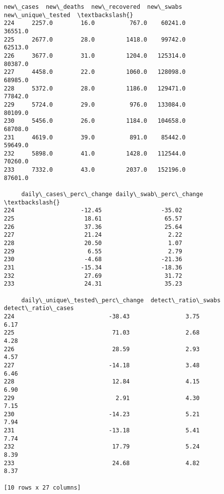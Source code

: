\documentclass[11pt]{article}
\begin{document}
\begin{tcolorbox}[breakable, size=fbox, boxrule=.5pt, pad at break*=1mm, opacityfill=0]
\begin{Verbatim}[commandchars=\\\{\}]
     new\_cases  new\_deaths  new\_recovered  new\_swabs  new\_unique\_tested  \textbackslash{}
224     2257.0        16.0          767.0    60241.0            36551.0
225     2677.0        28.0         1418.0    99742.0            62513.0
226     3677.0        31.0         1204.0   125314.0            80387.0
227     4458.0        22.0         1060.0   128098.0            68985.0
228     5372.0        28.0         1186.0   129471.0            77842.0
229     5724.0        29.0          976.0   133084.0            80109.0
230     5456.0        26.0         1184.0   104658.0            68708.0
231     4619.0        39.0          891.0    85442.0            59649.0
232     5898.0        41.0         1428.0   112544.0            70260.0
233     7332.0        43.0         2037.0   152196.0            87601.0

     daily\_cases\_perc\_change daily\_swab\_perc\_change  \textbackslash{}
224                   -12.45                 -35.02
225                    18.61                  65.57
226                    37.36                  25.64
227                    21.24                   2.22
228                    20.50                   1.07
229                     6.55                   2.79
230                    -4.68                 -21.36
231                   -15.34                 -18.36
232                    27.69                  31.72
233                    24.31                  35.23

     daily\_unique\_tested\_perc\_change  detect\_ratio\_swabs  detect\_ratio\_cases
224                           -38.43                3.75                6.17
225                            71.03                2.68                4.28
226                            28.59                2.93                4.57
227                           -14.18                3.48                6.46
228                            12.84                4.15                6.90
229                             2.91                4.30                7.15
230                           -14.23                5.21                7.94
231                           -13.18                5.41                7.74
232                            17.79                5.24                8.39
233                            24.68                4.82                8.37

[10 rows x 27 columns]
\end{Verbatim}
\end{tcolorbox}
        
\end{document}
